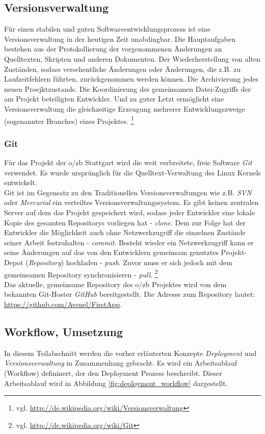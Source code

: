 \documentclass[12pt,             %
               a4paper,          %
               listof=totoc,     %
               index=totoc,      %
               bibliography=totoc,%
               oneside,         %
               BCOR1cm,          %
               english   %
               ]{scrbook}
\begin{document}
\subsection{Versionsverwaltung}
Für einen stabilen und guten Softwareentwicklungsprozess ist eine Versionsverwaltung in der heutigen Zeit unabdingbar. Die Hauptaufgaben bestehen aus der Protokollierung der vorgenommenen Änderungen an Quelltexten, Skripten und anderen Dokumenten. Der Wiederherstellung von alten Zuständen, sodass versehentliche Änderungen oder Änderungen, die z.B. zu Laufzeitfehlern führten, zurückgenommen werden können. Die Archivierung jedes neuen Proejktzustands. Die Koordinierung des gemeinsamen Datei-Zugriffs der am Projekt beteiligten Entwickler. Und zu guter Letzt ermöglicht eine Versionsverwaltung die gleichzeitige Erzeugung mehrerer Entwicklungszweige (sogenannter \glqq Branches\grqq) eines Projektes. \footnote{vgl. \url{http://de.wikipedia.org/wiki/Versionsverwaltung}}

\subsubsection{Git}
Für das Projekt der o/zb Stuttgart wird die weit verbreitete, freie Software \textit{Git} verwendet. Es wurde ursprünglich für die Quelltext-Verwaltung des Linux Kernels entwickelt.\\
Git ist im Gegensatz zu den Traditionellen Versionsverwaltungen wie z.B. \textit{SVN} oder \textit{Mercurial} ein verteiltes Versionsverwaltungssystem. Es gibt keinen zentralen Server auf dem das Projekt gespeichert wird, sodass jeder Entwickler eine lokale Kopie des gesamten Repositorys vorliegen hat - \textit{clone}. Dem zur Folge hat der Entwickler die Möglichkeit auch ohne Netzwerkzugriff die einzelnen Zustände seiner Arbeit festzuhalten - \textit{commit}. Besteht wieder ein Netzwerkzugriff kann er seine Änderungen auf das von den Entwicklern gemeinsam genutztes Projekt-Depot (\textit{Repository}) hochladen - \textit{push}. Zuvor muss er sich jedoch mit dem gemeinsamen Repository synchronisieren - \textit{pull}. \footnote{vgl. \url{http://de.wikipedia.org/wiki/Git}}\\

Das aktuelle, gemeinsame Repository des o/zb Projektes wird von dem bekannten Git-Hoster \textit{GitHub} bereitgestellt. Die Adresse zum Repository lautet: \url{https://github.com/Avenel/FirstApp}.

\subsection{Workflow, Umsetzung}
In diesem Teilabschnitt werden die vorher erläuterten Konzepte \textit{Deployment} und \textit{Versionsverwaltung} in Zusammenhang gebracht. Es wird ein Arbeitsablauf (\glqq Workflow\grqq) defininert, der den Deployment Prozess beschreibt. Dieser Arbeitsablauf wird in Abbildung \vref{fig:deployment_workflow} dargestellt.
\end{document}
